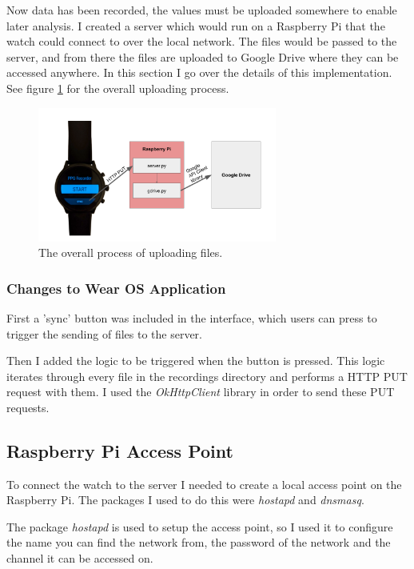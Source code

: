 \documentclass[12pt,a4paper,twoside,openright]{report}
\begin{document}
Now data has been recorded, the values must be uploaded somewhere to enable
later analysis. I created a server which would run on a Raspberry Pi that the
watch could connect to over the local network. The files would be passed to
the server, and from there the files are uploaded to Google Drive where they
can be accessed anywhere. In this section I go over the details of this
implementation. See figure \ref{fig:upload} for the overall uploading process.

\begin{figure}[tbh]
	\centerline{\includegraphics[width=0.7\textwidth]{figs/upload.png}}
	\caption{The overall process of uploading files.}
	\label{fig:upload}
\end{figure}

\subsubsection{Changes to Wear OS Application}

First a 'sync' button was included in the interface, which users can press to
trigger the sending of files to the server.

Then I added the logic to be triggered when the button is pressed. This logic
iterates through every file in the recordings directory and performs a HTTP
PUT request with them. I used the \emph{OkHttpClient} library in order to
send these PUT requests.

\subsection{Raspberry Pi Access Point}

To connect the watch to the server I needed to create a local access point on the
Raspberry Pi. The
packages I used to do this were \emph{hostapd} and \emph{dnsmasq}. 

The package \emph{hostapd} is used to setup the access point, so I used it to configure
the name you can find the network from, the password of the network and the
channel it can be accessed on. 
\end{document}
